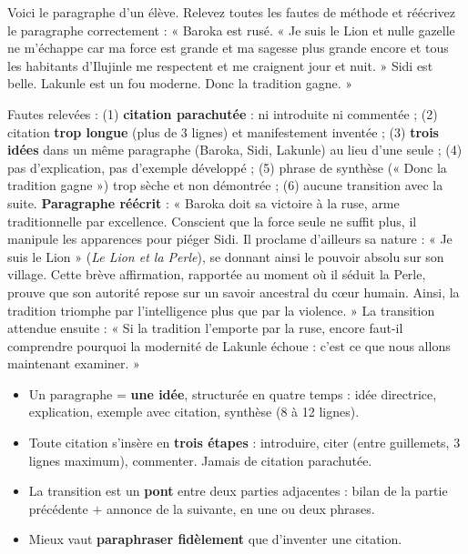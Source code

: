 \documentclass[11pt]{article}
\begin{document}
\begin{exercice}
Voici le paragraphe d'un élève. Relevez toutes les fautes de méthode et réécrivez le paragraphe correctement : « Baroka est rusé. « Je suis le Lion et nulle gazelle ne m'échappe car ma force est grande et ma sagesse plus grande encore et tous les habitants d'Ilujinle me respectent et me craignent jour et nuit. » Sidi est belle. Lakunle est un fou moderne. Donc la tradition gagne. »
\end{exercice}

\begin{corrige}
Fautes relevées : (1) \textbf{citation parachutée} : ni introduite ni commentée ; (2) citation \textbf{trop longue} (plus de 3 lignes) et manifestement inventée ; (3) \textbf{trois idées} dans un même paragraphe (Baroka, Sidi, Lakunle) au lieu d'une seule ; (4) pas d'explication, pas d'exemple développé ; (5) phrase de synthèse (« Donc la tradition gagne ») trop sèche et non démontrée ; (6) aucune transition avec la suite. \textbf{Paragraphe réécrit} : « Baroka doit sa victoire à la ruse, arme traditionnelle par excellence. Conscient que la force seule ne suffit plus, il manipule les apparences pour piéger Sidi. Il proclame d'ailleurs sa nature : « Je suis le Lion » (\emph{Le Lion et la Perle}), se donnant ainsi le pouvoir absolu sur son village. Cette brève affirmation, rapportée au moment où il séduit la Perle, prouve que son autorité repose sur un savoir ancestral du cœur humain. Ainsi, la tradition triomphe par l'intelligence plus que par la violence. » La transition attendue ensuite : « Si la tradition l'emporte par la ruse, encore faut-il comprendre pourquoi la modernité de Lakunle échoue : c'est ce que nous allons maintenant examiner. »
\end{corrige}

\begin{aretenir}
\begin{itemize}
\item Un paragraphe = \textbf{une idée}, structurée en quatre temps : idée directrice, explication, exemple avec citation, synthèse (8 à 12 lignes).
\item Toute citation s'insère en \textbf{trois étapes} : introduire, citer (entre guillemets, 3 lignes maximum), commenter. Jamais de citation parachutée.
\item La transition est un \textbf{pont} entre deux parties adjacentes : bilan de la partie précédente $+$ annonce de la suivante, en une ou deux phrases.
\item Mieux vaut \textbf{paraphraser fidèlement} que d'inventer une citation.
\end{itemize}
\end{aretenir}
\end{document}
